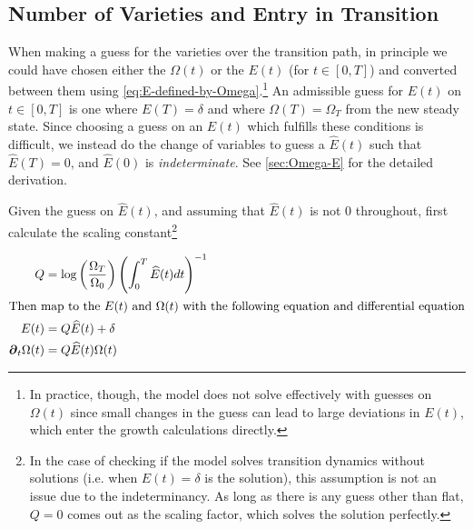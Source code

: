 \documentclass[11pt]{article}
\newcommand{\D}[1][]{\ensuremath{\boldsymbol{\partial}_{#1}}}
\begin{document}
\subsection{Number of Varieties and Entry in Transition}


When making a guess for the varieties over the transition path, in principle we could have chosen either the $\Omega(t)$ or the $E(t)$ (for $t \in [0,T]$) and converted between them using \cref{eq:E-defined-by-Omega}.\footnote{In practice, though, the model does not solve effectively with guesses on $\Omega(t)$ since small changes in the guess can lead to large deviations in $E(t)$, which enter the growth calculations directly.}  An admissible guess for $E(t)$ on $t \in [0,T]$ is one where $E(T) = \delta$ and where $\Omega(T) = \Omega_T$ from the new steady state.  Since choosing a guess on an $E(t)$ which fulfills these conditions is difficult, we instead do the change of variables to guess a $\widehat{E}(t)$ such that $\widehat{E}(T) = 0$, and $\widehat{E}(0)$ is \textit{indeterminate}.  See \cref{sec:Omega-E} for the detailed derivation.

Given the guess on $\widehat{E}(t)$, and assuming that $\widehat{E}(t)$ is not $0$ throughout, first calculate the scaling constant\footnote{In the case of checking if the model solves transition dynamics without solutions (i.e. when $E(t) = \delta$ is the solution), this assumption is not an issue due to the indeterminancy.  As long as there is any guess other than flat, $Q = 0$ comes out as the scaling factor, which solves the solution perfectly.}

\begin{align}
	Q &= \log \left(\dfrac{\Omega_T}{\Omega_0}\right)\left(\int_0^T \widehat E(t) dt \right)^{-1}\\
	\intertext{Then map to the $E(t)$ and $\Omega(t)$ with the following equation and differential equation}
	E(t) &= Q \widehat{E}(t) + \delta\\
	\D[t] \Omega(t) &= Q \widehat{E}(t) \Omega(t)
\end{align}
\end{document}
